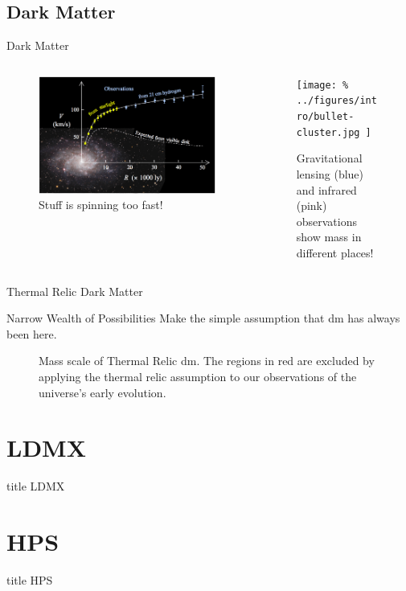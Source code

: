 \documentclass[notes,aspectratio=169]{beamer}
\newcommand{\ssection}[2]{%
  \section{#1}%
  \begin{frame}[label={#2}]%
    \vfill%
    \centering%
    \begin{beamercolorbox}[sep=8pt,center,shadow=true,rounded=true]{title}%
        \usebeamerfont{title}#1\par%
    \end{beamercolorbox}%
    \vfill%
  \end{frame}%
}%
\begin{document}
\subsection{Dark Matter}
\begin{frame}{Dark Matter}
  \begin{columns}
    \begin{column}{0.5\textwidth}
      \begin{figure}
        \includegraphics[width=\textwidth]{../figures/theory/rotation-curve-evidence-for-dm.png}
        \caption{Stuff is spinning too fast!}
      \end{figure}
    \end{column}
    \begin{column}{0.5\textwidth}
      \begin{figure}
        \texttt{[image: \%
          ../figures/intro/bullet-cluster.jpg
        ]}
        \caption{Gravitational lensing (blue) and infrared (pink) observations
        show mass in different places!}
      \end{figure}
    \end{column}
  \end{columns}
\end{frame}


\begin{frame}{Thermal Relic Dark Matter}
  \begin{block}{Narrow Wealth of Possibilities}
    Make the simple assumption that \ac{dm} has always been here.
  \end{block}
  \vfill
  \begin{figure}
    \centering
    
    \caption{Mass scale of Thermal Relic \ac{dm}.
      The regions in red are excluded by applying the thermal relic assumption
      to our observations of the universe's early evolution.}
    \label{fig:dm-mass-scale}
  \end{figure}
\end{frame}

\ssection{LDMX}{ldmx}

\ssection{HPS}{hps}

\begin{backup}

\end{backup}
\end{document}
